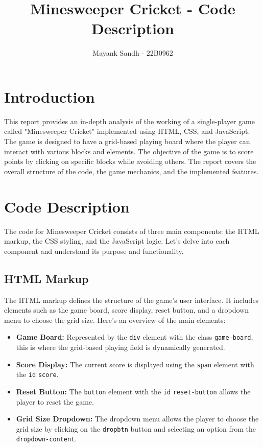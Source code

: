 \documentclass{article}
\title{Minesweeper Cricket - Code Description}
\author{Mayank Sandh - 22B0962}
\begin{document}
\maketitle

\section{Introduction}

This report provides an in-depth analysis of the working of a single-player game called "Minesweeper Cricket" implemented using HTML, CSS, and JavaScript. The game is designed to have a grid-based playing board where the player can interact with various blocks and elements. The objective of the game is to score points by clicking on specific blocks while avoiding others. The report covers the overall structure of the code, the game mechanics, and the implemented features.

\section{Code Description}

The code for Minesweeper Cricket consists of three main components: the HTML markup, the CSS styling, and the JavaScript logic. Let's delve into each component and understand its purpose and functionality.

\subsection{HTML Markup}

The HTML markup defines the structure of the game's user interface. It includes elements such as the game board, score display, reset button, and a dropdown menu to choose the grid size. Here's an overview of the main elements:

\begin{itemize}
  \item \textbf{Game Board:} Represented by the \texttt{div} element with the class \texttt{game-board}, this is where the grid-based playing field is dynamically generated.
  \item \textbf{Score Display:} The current score is displayed using the \texttt{span} element with the \texttt{id} \texttt{score}.
  \item \textbf{Reset Button:} The \texttt{button} element with the \texttt{id} \texttt{reset-button} allows the player to reset the game.
  \item \textbf{Grid Size Dropdown:} The dropdown menu allows the player to choose the grid size by clicking on the \texttt{dropbtn} button and selecting an option from the \texttt{dropdown-content}.
\end{itemize}
\end{document}
